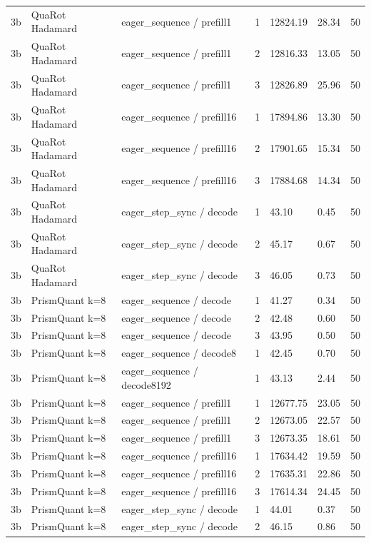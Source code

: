 {\begin{longtable}{lllllll}
3b & QuaRot Hadamard & eager\_sequence / prefill1 & 1 & 12824.19 & 28.34 & 50 \\
3b & QuaRot Hadamard & eager\_sequence / prefill1 & 2 & 12816.33 & 13.05 & 50 \\
3b & QuaRot Hadamard & eager\_sequence / prefill1 & 3 & 12826.89 & 25.96 & 50 \\
3b & QuaRot Hadamard & eager\_sequence / prefill16 & 1 & 17894.86 & 13.30 & 50 \\
3b & QuaRot Hadamard & eager\_sequence / prefill16 & 2 & 17901.65 & 15.34 & 50 \\
3b & QuaRot Hadamard & eager\_sequence / prefill16 & 3 & 17884.68 & 14.34 & 50 \\
3b & QuaRot Hadamard & eager\_step\_sync / decode & 1 & 43.10 & 0.45 & 50 \\
3b & QuaRot Hadamard & eager\_step\_sync / decode & 2 & 45.17 & 0.67 & 50 \\
3b & QuaRot Hadamard & eager\_step\_sync / decode & 3 & 46.05 & 0.73 & 50 \\
3b & PrismQuant k=8 & eager\_sequence / decode & 1 & 41.27 & 0.34 & 50 \\
3b & PrismQuant k=8 & eager\_sequence / decode & 2 & 42.48 & 0.60 & 50 \\
3b & PrismQuant k=8 & eager\_sequence / decode & 3 & 43.95 & 0.50 & 50 \\
3b & PrismQuant k=8 & eager\_sequence / decode8 & 1 & 42.45 & 0.70 & 50 \\
3b & PrismQuant k=8 & eager\_sequence / decode8192 & 1 & 43.13 & 2.44 & 50 \\
3b & PrismQuant k=8 & eager\_sequence / prefill1 & 1 & 12677.75 & 23.05 & 50 \\
3b & PrismQuant k=8 & eager\_sequence / prefill1 & 2 & 12673.05 & 22.57 & 50 \\
3b & PrismQuant k=8 & eager\_sequence / prefill1 & 3 & 12673.35 & 18.61 & 50 \\
3b & PrismQuant k=8 & eager\_sequence / prefill16 & 1 & 17634.42 & 19.59 & 50 \\
3b & PrismQuant k=8 & eager\_sequence / prefill16 & 2 & 17635.31 & 22.86 & 50 \\
3b & PrismQuant k=8 & eager\_sequence / prefill16 & 3 & 17614.34 & 24.45 & 50 \\
3b & PrismQuant k=8 & eager\_step\_sync / decode & 1 & 44.01 & 0.37 & 50 \\
3b & PrismQuant k=8 & eager\_step\_sync / decode & 2 & 46.15 & 0.86 & 50 \\

\end{longtable}}
